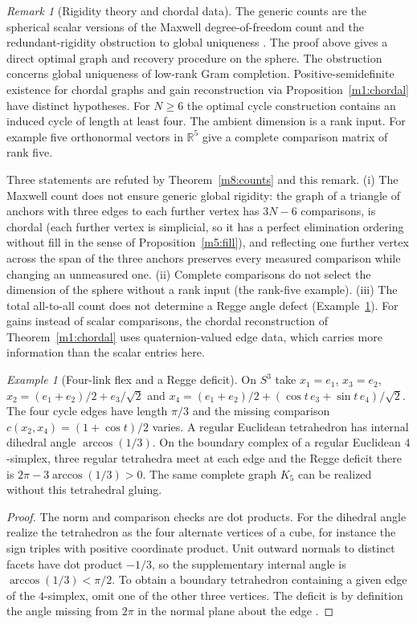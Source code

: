 \documentclass[11pt,reqno]{amsart}
\theoremstyle{definition}
\theoremstyle{remark}
\newtheorem{remark}[theorem]{Remark}
\newtheorem{example}[theorem]{Example}
\numberwithin{equation}{section}
\begin{document}
\begin{remark}[Rigidity theory and chordal data]\label{m8:prior-rigidity}
The generic counts are the spherical scalar versions of the
Maxwell degree-of-freedom count and the redundant-rigidity
obstruction to global uniqueness \cite{m8:hendrickson,m8:coning}.
The proof above gives a direct optimal graph and recovery procedure
on the sphere. The obstruction concerns global uniqueness of
low-rank Gram completion. Positive-semidefinite existence for
chordal graphs \cite{m1:Grone} and gain reconstruction via
Proposition~\ref{m1:chordal} have distinct hypotheses.
For $N\ge6$ the optimal cycle construction contains an induced
cycle of length at least four. The ambient dimension is a rank
input. For example five orthonormal vectors in $\mathbb R^5$
give a complete comparison matrix of rank five.

Three statements are refuted by Theorem~\ref{m8:counts} and this remark.  (i) The Maxwell count \cite{m8:maxwell} does not ensure
generic global rigidity: the graph of a triangle of anchors with three edges to each further vertex has $3N-6$ comparisons, is
chordal (each further vertex is simplicial, so it has a perfect elimination ordering without fill in the sense of
Proposition~\ref{m5:fill}), and reflecting one further vertex across the span of the three anchors preserves every measured comparison
while changing an unmeasured one.  (ii) Complete comparisons do not select the dimension of the sphere without a rank input (the
rank-five example).  (iii) The total all-to-all count does not determine a Regge angle defect (Example~\ref{m8:flex}).  For gains
instead of scalar comparisons, the chordal reconstruction of Theorem~\ref{m1:chordal} uses quaternion-valued edge data, which carries
more information than the scalar entries here.
\end{remark}

\begin{example}[Four-link flex and a Regge deficit]\label{m8:flex}
On $S^3$ take $x_1=e_1$, $x_3=e_2$, $x_2=(e_1+e_2)/2+e_3/\sqrt2$
and $x_4=(e_1+e_2)/2+(\cos t\,e_3+\sin t\,e_4)/\sqrt2$.
The four cycle edges have length $\pi/3$ and the missing
comparison $c(x_2,x_4)=(1+\cos t)/2$ varies. A regular Euclidean
tetrahedron has internal dihedral angle $\arccos(1/3)$.
On the boundary complex of a regular Euclidean $4$-simplex,
three regular tetrahedra meet at each edge and the Regge deficit
there is $2\pi-3\arccos(1/3)>0$. The same complete graph $K_5$
can be realized without this tetrahedral gluing.
\end{example}
\begin{proof}
The norm and comparison checks are dot products. For the
dihedral angle realize the tetrahedron as the four alternate
vertices of a cube, for instance the sign triples with positive
coordinate product. Unit outward normals to distinct facets
have dot product $-1/3$, so the supplementary internal angle is
$\arccos(1/3)<\pi/2$. To obtain a boundary tetrahedron containing
a given edge of the $4$-simplex, omit one of the other three
vertices. The deficit is by definition the angle missing from
$2\pi$ in the normal plane about the edge \cite{m8:regge}.
\end{proof}
\end{document}

